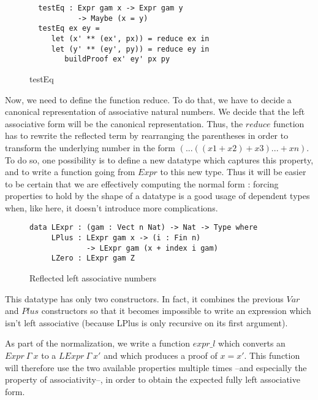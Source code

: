 \begin{figure}[H]
\figrule
\begin{center}
\begin{verbatim}
  testEq : Expr gam x -> Expr gam y 
           -> Maybe (x = y)
  testEq ex ey = 
     let (x' ** (ex', px)) = reduce ex in 
     let (y' ** (ey', py)) = reduce ey in
        buildProof ex' ey' px py 
\end{verbatim}
\end{center}
\caption{testEq}
\figrule
\end{figure}

Now, we need to define the function reduce. To do that, we have to decide a canonical representation of associative natural numbers. We decide that the left associative form will be the canonical representation. Thus, the $reduce$ function has to rewrite the reflected term by rearranging the parentheses in order to transform the underlying number in the form $(...((x1 + x2) + x3) ... + xn)$. To do so, one possibility is to define a new datatype which captures this property, and to write a function going from $Expr$ to this new type. Thus it will be easier to be certain that we are effectively computing the normal form : forcing properties to hold by the shape of a datatype is a good usage of dependent types when, like here, it doesn't introduce more complications.

\begin{figure}[H]
\figrule
\begin{center}
\begin{verbatim}
data LExpr : (gam : Vect n Nat) -> Nat -> Type where
     LPlus : LExpr gam x -> (i : Fin n) 
             -> LExpr gam (x + index i gam)
     LZero : LExpr gam Z
\end{verbatim}
\end{center}
\caption{Reflected left associative numbers}
\figrule
\end{figure}

This datatype has only two constructors. In fact, it combines the previous $Var$ and $Plus$ constructors so that it becomes impossible to write an expression which isn't left associative (because LPlus is only recursive on its first argument).
 
As part of the normalization, we write a function $expr\_l$ which converts an $Expr\ \Gamma\ x$ to a $LExpr\ \Gamma\ x'$ and which produces a proof of $x=x'$. This function will therefore use the two available properties multiple times --and especially the property of associativity--, in order to obtain the expected fully left associative form. 

